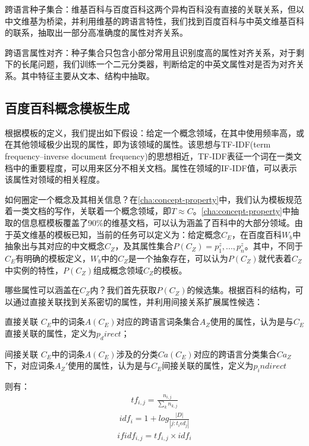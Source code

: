 {\heiti 跨语言种子集合：}维基百科与百度百科这两个异构百科没有直接的关联关系，但以中文维基为桥梁，并利用维基的跨语言特性，我们找到百度百科与中英文维基百科的联系，抽取出一部分高准确度的属性对齐关系。

{\heiti 跨语言属性对齐：}种子集合只包含小部分常用且识别度高的属性对齐关系，对于剩下的长尾问题，我们训练一个二元分类器，判断给定的中英文属性对是否为对齐关系。其中特征主要从文本、结构中抽取。

\subsection{百度百科概念模板生成}
\label{sec:domain-template}
根据模板的定义，我们提出如下假设：给定一个概念领域，在其中使用频率高，或在其他领域极少出现的属性，即为该领域的属性。该思想与TF-IDF(term frequency–inverse document frequency)的思想相近，TF-IDF表征一个词在一类文档中的重要程度，可以用来区分不相关文档。属性在领域的IF-IDF值，可以表示该属性对领域的相关程度。

如何圈定一个概念及其相关信息？在\ref{cha:concept-property}中，我们认为模板规范着一类文档的写作，关联着一个概念领域，即$T \approx C$。\ref{cha:concept-property}中抽取的信息框模板覆盖了90\%的维基文档，可以认为涵盖了百科中的大部分领域。由于英文维基的模板已知，当前的任务可以定义为：给定概念$C_E$，在百度百科$W_b$中抽象出与其对应的中文概念$C_Z$，及其属性集合$P(C_Z)={p_1^z,...,p_n^z}$。其中，不同于$C_E$有明确的模板定义，$W_b$中的$C_Z$是一个抽象存在，可以认为$P(C_Z)$就代表着$C_Z$中实例的特性，$P(C_Z)$组成概念领域$C_Z$的模板。

哪些属性可以涵盖在$C_Z$内？我们首先获取$P(C_Z)$的候选集。根据百科的结构，可以通过直接关联找到关系密切的属性，并利用间接关系扩展属性候选：

{\heiti 直接关联} $C_E$中的词条$A(C_E)$对应的跨语言词条集合$A_Z$使用的属性，认为是与$C_E$直接关联的属性，定义为$p_direct$；

{\heiti 间接关联} $C_E$中的词条$A(C_E)$涉及的分类$Ca(C_E)$对应的跨语言分类集合$Ca_Z$下，对应词条$A_Z'$使用的属性，认为是与$C_E$间接关联的属性，定义为$p_indirect$

则有：
\begin{align}
\label{equ:tf}
tf_{i,j}=\frac{n_{i,j}}{\sum_{k}{n_{k,j}}}
\end{align}
\begin{align}
\label{equ:idf}
idf_{i}=1+log\frac{\left | D \right |}{\left | j:t_i  \epsilon d_j \right |}
\end{align}
\begin{align}
\label{equ:tfidf}
ifidf_{i,j}=tf_{i,j}\times idf_{i}
\end{align}

